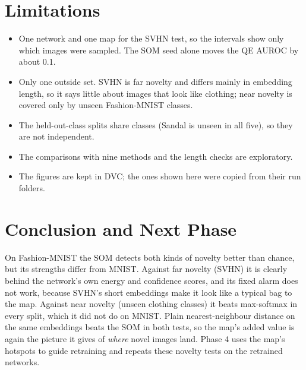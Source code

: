 \documentclass[11pt]{article}
\begin{document}
\section{Limitations}

\begin{itemize}[leftmargin=1.4em, itemsep=2pt]
  \item One network and one map for the SVHN test, so the intervals show only which images were sampled. The SOM seed alone moves the QE AUROC by about 0.1.
  \item Only one outside set. SVHN is far novelty and differs mainly in embedding length, so it says little about images that look like clothing; near novelty is covered only by unseen Fashion-MNIST classes.
  \item The held-out-class splits share classes (Sandal is unseen in all five), so they are not independent.
  \item The comparisons with nine methods and the length checks are exploratory.
  \item The figures are kept in DVC; the ones shown here were copied from their run folders.
\end{itemize}

\section{Conclusion and Next Phase}

On Fashion-MNIST the SOM detects both kinds of novelty better than chance, but its strengths differ from MNIST. Against far novelty (SVHN) it is clearly behind the network's own energy and confidence scores, and its fixed alarm does not work, because SVHN's short embeddings make it look like a typical bag to the map. Against near novelty (unseen clothing classes) it beats max-softmax in every split, which it did not do on MNIST. Plain nearest-neighbour distance on the same embeddings beats the SOM in both tests, so the map's added value is again the picture it gives of \emph{where} novel images land. Phase 4 uses the map's hotspots to guide retraining and repeats these novelty tests on the retrained networks.

\clearpage
\printbibliography[title={References}]
\end{document}
